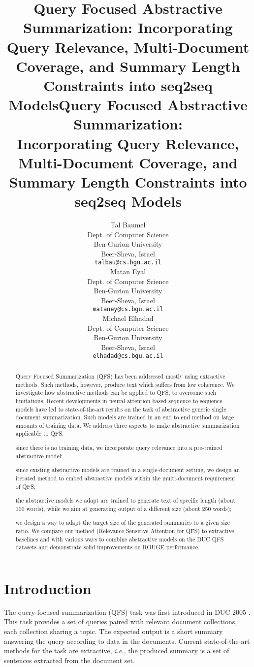 \documentclass[11pt,a4paper]{article}
\title{Query Focused Abstractive Summarization: Incorporating Query Relevance, Multi-Document Coverage, and Summary Length Constraints into seq2seq Models}
\author{Tal Baumel \\
  Dept. of Computer Science  \\
  Ben-Gurion University  \\
  Beer-Sheva, Israel \\
  {\tt talbau@cs.bgu.ac.il} \\\And
  Matan Eyal \\
  Dept. of Computer Science  \\
  Ben-Gurion University  \\
  Beer-Sheva, Israel \\
  {\tt mataney@cs.bgu.ac.il} \\\And
  Michael Elhadad \\
  Dept. of Computer Science  \\
  Ben-Gurion University  \\
  Beer-Sheva, Israel \\
  {\tt elhadad@cs.bgu.ac.il} \\}
\date{}
\begin{document}
\title{Query Focused Abstractive Summarization:\\Incorporating Query Relevance, Multi-Document Coverage, and Summary Length Constraints into seq2seq Models}

\maketitle

\begin{abstract}
Query Focused Summarization (QFS) has been addressed mostly using extractive methods. Such methods, however, produce text which suffers from low coherence. 
We investigate how abstractive methods can be applied to QFS, to overcome such limitations.  Recent developments in neural-attention based sequence-to-sequence models have led to state-of-the-art results on the task of abstractive generic single document summarization. Such models are trained in an end to end method on large amounts of training data. We address three aspects to make abstractive summarization applicable to QFS: \begin{enumerate*}[label=(\itshape\alph*\upshape)]
\item since there is no training data, we incorporate query relevance into a pre-trained abstractive model;
\item since existing abstractive models are trained in a single-document setting, we design an iterated method to embed abstractive models within the multi-document requirement of QFS;
\item the abstractive models we adapt are trained to generate text of specific length (about 100 words), while we aim at generating output of a different size (about 250 words);
\end{enumerate*}  
we design a way to adapt the target size of the generated summaries to a given size ratio.  We compare our method (Relevance Sensitive Attention for QFS) to extractive baselines and with various ways to combine abstractive models on the DUC QFS datasets and demonstrate solid improvements on ROUGE performance.

\end{abstract}

\section{Introduction}
The query-focused summarization (QFS) task was first introduced in  DUC 2005 \cite{dang2005overview}. This task provides a set of queries paired with relevant document collections, each collection sharing a topic. The expected output is a short summary answering the query according to data in the documents.  Current state-of-the-art methods for the task \cite{DBLP:journals/corr/abs-0907-1814,fisher2006query,Feigenblat:2017:UQM:3077136.3080690} are extractive, {\em i.e.}, the produced summary is a set of sentences extracted from the document set. 
\end{document}
